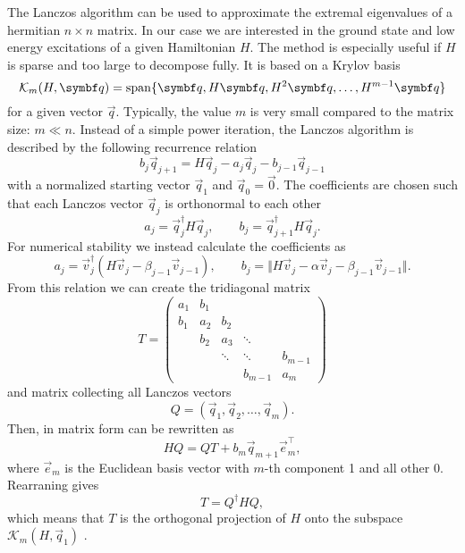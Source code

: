 The Lanczos algorithm \cite{Lanczos1950} can be used to approximate the extremal eigenvalues
of a hermitian $n\times n$ matrix.
In our case we are interested in the ground state and low energy excitations of a
given Hamiltonian $H$.
The method is especially useful if $H$ is sparse and too large to decompose fully.
It is based on a Krylov basis
\begin{equation}
    \mathcal{K}_m(H, \vec{q}) = \spn\{\vec{q}, H\vec{q}, H^2\vec{q}, \ldots, H^{m-1}\vec{q}\}
\end{equation}
for a given vector $\vec{q}$.
Typically, the value $m$ is very small compared to the matrix size: $m \ll n$.
Instead of a simple power iteration, the Lanczos algorithm is described by the
following recurrence relation
\begin{equation}
    b_j\vec{q}_{j+1} = H\vec{q}_j - a_j\vec{q}_j - b_{j-1}\vec{q}_{j-1}
    \label{eq:Lanczos-recurrence}
\end{equation}
with a normalized starting vector $\vec{q}_1$ and $\vec{q}_0 = \vec{0}$.
The coefficients are chosen such that each Lanczos vector $\vec{q}_j$ is orthonormal to each other
\begin{equation}
    a_j = \vec{q}_j^\dag H \vec{q}_j,
    \qquad
    b_j = \vec{q}_{j+1}^\dag H \vec{q}_j.
\end{equation}
For numerical stability \cite{Paige1972, Paige1976}
we instead calculate the coefficients as
\begin{equation}
    a_j = \vec{v}_j^\dag(H \vec{v}_j - \beta_{j-1}\vec{v}_{j-1}),
    \qquad
    b_j = \Vert H\vec{v}_j - \alpha\vec{v}_j -  \beta_{j-1}\vec{v}_{j-1} \Vert.
\end{equation}
From this relation we can create the tridiagonal matrix
\begin{equation}
    T
    =
    \begin{pmatrix}
        a_1 & b_1 &        &         &         \\
        b_1 & a_2 & b_2    &         &         \\
            & b_2 & a_3    & \ddots  &         \\
            &     & \ddots & \ddots  & b_{m-1} \\
            &     &        & b_{m-1} & a_m
    \end{pmatrix}
\end{equation}
and matrix collecting all Lanczos vectors
\begin{equation}
    Q = (\vec{q}_1, \vec{q}_2, \ldots, \vec{q}_m).
\end{equation}
Then,  in matrix form can be rewritten as
\begin{equation}
    H Q = Q T + b_{m}\vec{q}_{m+1}\vec{e}_{m}^\top,
\end{equation}
where $\vec{e}_m$ is the Euclidean basis vector with $m$-th component 1 and all other 0.
Rearraning gives
\begin{equation}
    T = Q^\dag H Q,
\end{equation}
which means that $T$ is the orthogonal projection of $H$ onto
the subspace $\mathcal{K}_m(H, \vec{q}_1)$ \cite{Cullum1985}.

